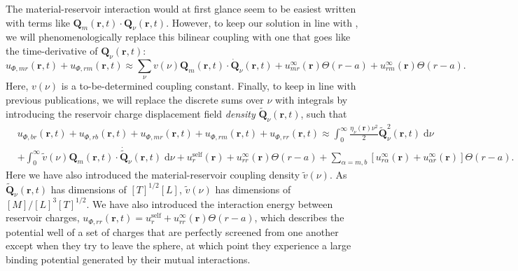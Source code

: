 \documentclass{article}
\begin{document}
The material-reservoir interaction would at first glance seem to be easiest written with terms like $\mathbf{Q}_m(\mathbf{r},t)\cdot\mathbf{Q}_\nu(\mathbf{r},t)$. However, to keep our solution in line with \citet{huttner1992quantization}, we will phenomenologically replace this bilinear coupling with one that goes like the time-derivative of $\mathbf{Q}_\nu(\mathbf{r},t)$:
\begin{equation}
u_{\Phi,mr}(\mathbf{r},t) + u_{\Phi,rm}(\mathbf{r},t) \approx \sum_\nu v(\nu)\mathbf{Q}_m(\mathbf{r},t)\cdot\dot{\mathbf{Q}}_\nu(\mathbf{r},t) + u_{mr}^\infty(\mathbf{r})\Theta(r - a) + u_{rm}^\infty(\mathbf{r})\Theta(r - a).
\end{equation}
Here, $v(\nu)$ is a to-be-determined coupling constant. Finally, to keep in line with previous publications, we will replace the discrete sums over $\nu$ with integrals by introducing the reservoir charge displacement field \textit{density} $\tilde{\mathbf{Q}}_\nu(\mathbf{r},t)$, such that
\begin{equation}
\begin{split}
&u_{\Phi,br}(\mathbf{r},t) + u_{\Phi,rb}(\mathbf{r},t) + u_{\Phi,mr}(\mathbf{r},t) + u_{\Phi,rm}(\mathbf{r},t) + u_{\Phi,rr}(\mathbf{r},t) \approx \int_0^\infty\frac{\eta_\nu(\mathbf{r})\nu^2}{2}\tilde{\mathbf{Q}}_\nu^2(\mathbf{r},t)\;\mathrm{d}\nu\\
&+ \int_0^\infty\tilde{v}(\nu)\mathbf{Q}_m(\mathbf{r},t)\cdot\dot{\tilde{\mathbf{Q}}}_\nu(\mathbf{r},t)\;\mathrm{d}\nu + u_{r}^\mathrm{self}(\mathbf{r}) + u_{rr}^\infty(\mathbf{r})\Theta(r - a) + \sum_{\alpha = m,b}\left[u_{r\alpha}^\infty(\mathbf{r}) + u_{\alpha r}^\infty(\mathbf{r})\right]\Theta(r - a).
\end{split}
\end{equation}
Here we have also introduced the material-reservoir coupling density $\tilde{v}(\nu)$. As $\tilde{\mathbf{Q}}_\nu(\mathbf{r},t)$ has dimensions of $[T]^{1/2}[L]$, $\tilde{v}(\nu)$ has dimensions of $[M]/[L]^3[T]^{1/2}$. We have also introduced the interaction energy between reservoir charges, $u_{\Phi,rr}(\mathbf{r},t) = u_{r}^\mathrm{self} + u_{rr}^\infty(\mathbf{r})\Theta(r - a)$, which describes the potential well of a set of charges that are perfectly screened from one another except when they try to leave the sphere, at which point they experience a large binding potential generated by their mutual interactions.
\end{document}

